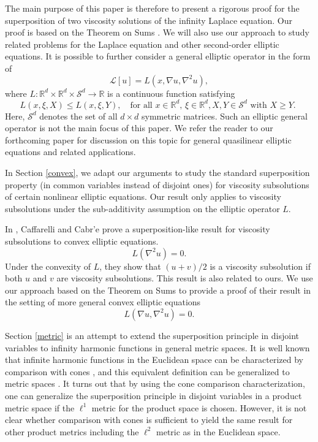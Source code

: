 \documentclass[12pt, reqno]{amsart}
\newcommand{\R}{\mathbb{R}}
\def\R{{\mathbb R}}
\def\L{{\mathcal L}}
\def\S{{\mathcal S}}
\begin{document}
The main purpose of this paper is therefore to present a rigorous proof for the superposition of two viscosity solutions of the infinity Laplace equation.  Our proof is based on the Theorem on Sums \cite[Theorem 3.2]{CIL}. We will also use our approach to study related problems for the Laplace equation and other second-order elliptic equations. 
It is possible to further consider a general elliptic operator in the form of 
\[
\L[u]=L(x, \nabla u, \nabla^2 u), 
\]
where $L: \R^d \times \R^d\times \S^d\to \R$ is a continuous function satisfying
\begin{equation}\label{ellip}
L(x,  \xi, X)\leq L(x, \xi, Y), \quad \text{for all $x\in \mathbb{R}^d$, $\xi\in \mathbb{R}^d, X, Y\in \S^d$ with $X\geq Y$. }
\end{equation}
Here, $\S^d$ denotes the set of all $d\times d$ symmetric matrices. Such an elliptic general operator is not the main focus of this paper. We refer the reader to our forthcoming paper \cite{LMZ24} for discussion on this topic for general quasilinear elliptic equations and related applications. 

In Section \ref{convex}, we adapt our arguments to study the standard superposition property (in common variables instead of disjoint ones) for viscosity subsolutions of certain nonlinear elliptic equations. Our result only applies to viscosity subsolutions under the sub-additivity assumption on the elliptic operator $L$. 

In \cite[Theorem 5.8]{CaCr}, Caffarelli and Cabr'e prove a superposition-like result for viscosity subsolutions to convex elliptic equations. 
\[
L(\nabla^2 u)=0.
\]
Under the convexity of $L$, they show that $(u+v)/2$ is a viscosity subsolution if both $u$ and $v$ are viscosity subsolutions. This result is also related to ours. We use our approach based on the Theorem on Sums to provide a proof of their result in the setting of more general convex elliptic equations 
\[
L(\nabla u, \nabla^2 u)=0. 
\]

Section \ref{metric} is an attempt to extend the superposition principle in disjoint variables to infinity harmonic functions in general metric spaces. 
It is well known that infinite harmonic functions in the Euclidean space can be characterized by comparison with cones \cite{ArCrJu}, and this equivalent definition can be generalized to metric spaces \cite{Ju, JuSh}. It turns out that by using the cone comparison characterization, one can generalize the superposition principle in disjoint variables in a product metric space if the $\ell^1$ metric for the product space is chosen. However, it is not clear whether comparison with cones is sufficient to yield the same result for other product metrics including the $\ell^2$ metric as in the Euclidean space. 
 
\end{document}
